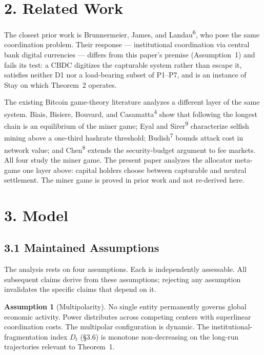 \documentclass[12pt]{article}
\theoremstyle{definition}
\newtheorem{assumption}{Assumption}
\theoremstyle{remark}
\begin{document}
\newpage


\section{2. Related Work}

The closest prior work is Brunnermeier, James, and
Landau\textsuperscript{6}, who pose the same coordination problem.
Their response --- institutional coordination via central bank
digital currencies --- differs from this paper's premise
(Assumption~1) and fails its test: a CBDC digitizes the capturable
system rather than escape it, satisfies neither D1 nor a load-bearing
subset of P1--P7, and is an instance of Stay on which Theorem~2
operates.

The existing Bitcoin game-theory literature analyzes a different
layer of the same system. Biais, Bisiere, Bouvard, and
Casamatta\textsuperscript{4} show that following the longest chain
is an equilibrium of the miner game; Eyal and
Sirer\textsuperscript{9} characterize selfish mining above a
one-third hashrate threshold; Budish\textsuperscript{7} bounds
attack cost in network value; and Chen\textsuperscript{8} extends
the security-budget argument to fee markets. All four study the
miner game. The present paper analyzes the allocator meta-game one
layer above: capital holders choose between capturable and neutral
settlement. The miner game is proved in prior work and not re-derived
here.


\section{3. Model}

\subsection{3.1 Maintained Assumptions}

The analysis rests on four assumptions. Each is independently assessable. All subsequent claims derive from these assumptions; rejecting any assumption invalidates the specific claims that depend on it.

\begin{assumption}[Multipolarity]
No single entity permanently governs global economic activity. Power
distributes across competing centers with superlinear coordination
costs. The multipolar configuration is dynamic. The institutional-fragmentation index $D_t$ (\S3.6) is monotone non-decreasing on the long-run trajectories relevant to Theorem~1.
\end{assumption}
\end{document}
